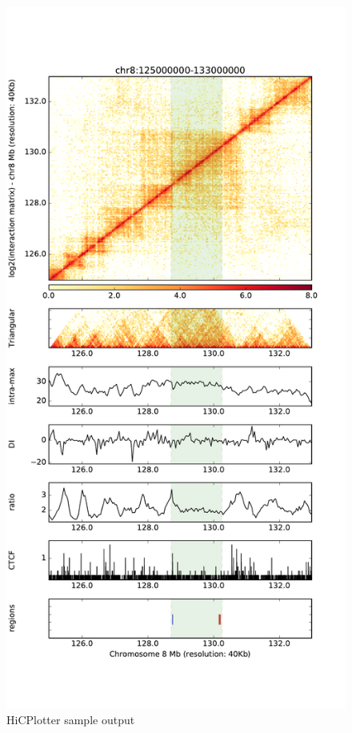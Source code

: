 \begin{figure}[!htb]
    \includegraphics[width=\textwidth,height=\textheight,keepaspectratio]{figure/hicplotter_chr8-125000000-133000000}
    \caption{HiCPlotter sample output} %
    \label{fig:hicplotter_chr8}
\end{figure}
\clearpage
